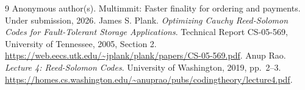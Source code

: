 \documentclass[11pt,a4paper]{article}
\theoremstyle{definition}
\begin{document}
\begin{thebibliography}{9}
Anonymous author(s).
\newblock Multimmit: Faster finality for ordering and payments.
\newblock Under submission, 2026.
 James S. Plank.
\emph{Optimizing Cauchy Reed-Solomon Codes for Fault-Tolerant Storage
Applications}. Technical Report CS-05-569, University of Tennessee, 2005,
Section 2.
\url{https://web.eecs.utk.edu/~jplank/plank/papers/CS-05-569.pdf}.
 Anup Rao.
\emph{Lecture 4: Reed-Solomon Codes}. University of Washington, 2019,
pp.~2--3.
\url{https://homes.cs.washington.edu/~anuprao/pubs/codingtheory/lecture4.pdf}.
\end{thebibliography}
\end{document}
